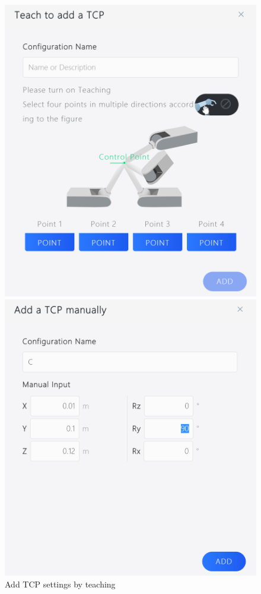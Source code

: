 \begin{figure}[htb]
	\centering
	\begin{minipage}[t]{0.48\linewidth}
		\centering
		\includegraphics[width=\linewidth]{en/image/3-24.png}
		\caption{Add TCP settings by teaching}
		\label{fig:示教添加TCP设置}
	\end{minipage}
	\hfill
	\begin{minipage}[t]{0.48\linewidth}
		\centering
		\includegraphics[width=\linewidth]{en/image/3-25.png}

\end{minipage}
\end{figure}
